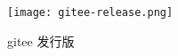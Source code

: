 \begin{figure}[htbp]
  \centering
  \texttt{[image: gitee-release.png]}
  \caption{gitee 发行版}
  \label{figure:gitee发行版}
\end{figure}





